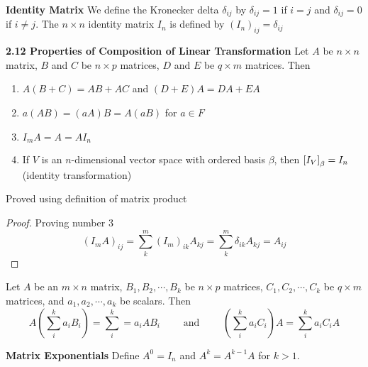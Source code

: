 \documentclass[11pt]{article}
\begin{document}
\begin{defn*}
    \textbf{Identity Matrix} We define the Kronecker delta $\delta_{ij}$ by $\delta_{ij}=1$ if $i=j$ and $\delta_{ij}=0$ if $i\neq j$. The $n\times n$ identity matrix $I_n$ is defined by $(I_n)_{ij} = \delta_{ij}$
\end{defn*}

\begin{theorem*}
    \textbf{2.12 Properties of Composition of Linear Transformation} Let $A$ be $n\times n$ matrix, $B$ and $C$ be $n\times p$ matrices, $D$ and $E$ be $q\times m$ matrices. Then 
    \begin{enumerate}
        \item $A(B+C)=AB+AC$ and $(D+E)A = DA+EA$
        \item $a(AB) = (aA)B = A(aB)$ for $a\in F$
        \item $I_m A = A = AI_n$ 
        \item If $V$ is an $n$-dimensional vector space with ordered basis $\beta$, then $\left[ I_V \right]_{\beta} = I_n$ (identity transformation)
    \end{enumerate}
    Proved using definition of matrix product 
    \begin{proof}
        Proving number 3
        \[
            (I_m A)_{ij} = \sum_k^m (I_m)_{ik} A_{kj} = \sum_k^m \delta_{ik} A_{kj} = A_{ij}    
        \]
    \end{proof}
\end{theorem*}


\begin{corollary*}
    Let $A$ be an $m\times n$ matrix, $B_1,B_2,\cdots, B_k$ be $n\times p$ matrices, $C_1,C_2,\cdots, C_k$ be $q\times m$ matrices, and $a_1,a_2,\cdots, a_k$ be scalars. Then 
    \[
        A\left( \sum_i^k a_i B_i \right) = \sum_i^k = a_i AB_i 
        \quad \quad \text{ and } \quad \quad 
        \left( \sum_i^k a_i C_i \right) A = \sum_i^k a_i C_i A
    \]
\end{corollary*}


\begin{defn*}
    \textbf{Matrix Exponentials} Define $A^0 = I_n$ and $A^k = A^{k-1}A$ for $k > 1$. 
\end{defn*}
\end{document}
